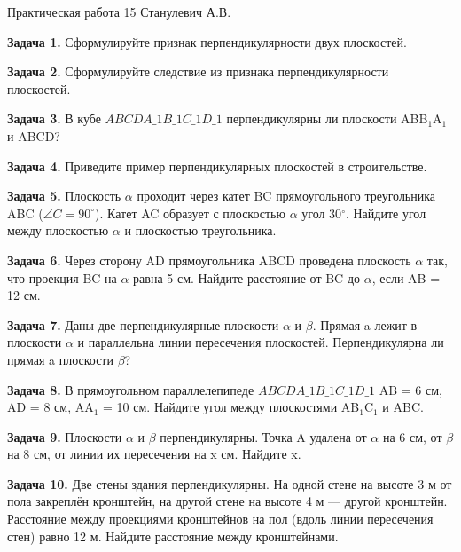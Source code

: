 \documentclass{umk-matematika}
\begin{document}
\maketitlepage
    {Практическая работа 15}
    {}
    {Станулевич А.В.}

\textbf{Задача 1.} Сформулируйте признак перпендикулярности двух плоскостей.\par\vspace{10pt}
\textbf{Задача 2.} Сформулируйте следствие из признака перпендикулярности плоскостей.\par\vspace{10pt}
\textbf{Задача 3.} В кубе $ABCDA\_1B\_1C\_1D\_1$ перпендикулярны ли плоскости ABB$_1$A$_1$ и ABCD?\par\vspace{10pt}
\textbf{Задача 4.} Приведите пример перпендикулярных плоскостей в строительстве.\par\vspace{10pt}
\textbf{Задача 5.} Плоскость $\alpha$ проходит через катет BC прямоугольного треугольника ABC ($\angle C = 90^\circ$). Катет AC образует с плоскостью $\alpha$ угол 30$^\circ$. Найдите угол между плоскостью $\alpha$ и плоскостью треугольника.\par\vspace{10pt}
\textbf{Задача 6.} Через сторону AD прямоугольника ABCD проведена плоскость $\alpha$ так, что проекция BC на $\alpha$ равна 5 см. Найдите расстояние от BC до $\alpha$, если AB = 12 см.\par\vspace{10pt}
\textbf{Задача 7.} Даны две перпендикулярные плоскости $\alpha$ и $\beta$. Прямая a лежит в плоскости $\alpha$ и параллельна линии пересечения плоскостей. Перпендикулярна ли прямая a плоскости $\beta$?\par\vspace{10pt}
\textbf{Задача 8.} В прямоугольном параллелепипеде $ABCDA\_1B\_1C\_1D\_1$ AB = 6 см, AD = 8 см, AA$_1$ = 10 см. Найдите угол между плоскостями AB$_1$C$_1$ и ABC.\par\vspace{10pt}
\textbf{Задача 9.} Плоскости $\alpha$ и $\beta$ перпендикулярны. Точка A удалена от $\alpha$ на 6 см, от $\beta$ на 8 см, от линии их пересечения на x см. Найдите x.\par\vspace{10pt}
\textbf{Задача 10.} Две стены здания перпендикулярны. На одной стене на высоте 3 м от пола закреплён кронштейн, на другой стене на высоте 4 м — другой кронштейн. Расстояние между проекциями кронштейнов на пол (вдоль линии пересечения стен) равно 12 м. Найдите расстояние между кронштейнами.\par\vspace{10pt}
\newpage
\end{document}
